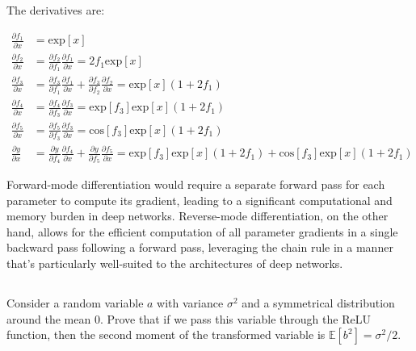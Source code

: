 \documentclass[12pt]{report}
\begin{document}
The derivatives are:

\begin{align*}
    \frac{\partial f_{1}}{\partial x} & = \text{exp}[x]                                                                                                                                                                                                                     \\
    \frac{\partial f_{2}}{\partial x} & = \frac{\partial f_{2}}{\partial f_{1}}\frac{\partial f_{1}}{\partial x} = 2f_{1}\text{exp}[x]                                                                                                                                      \\
    \frac{\partial f_{3}}{\partial x} & = \frac{\partial f_{3}}{\partial f_{1}}\frac{\partial f_{1}}{\partial x} + \frac{\partial f_{3}}{\partial f_{2}}\frac{\partial f_{2}}{\partial x} = \text{exp}[x](1 + 2f_{1})                                                       \\
    \frac{\partial f_{4}}{\partial x} & = \frac{\partial f_{4}}{\partial f_{3}}\frac{\partial f_{3}}{\partial x} = \text{exp}[f_{3}]\text{exp}[x](1 + 2f_{1})                                                                                                               \\
    \frac{\partial f_{5}}{\partial x} & = \frac{\partial f_{5}}{\partial f_{3}}\frac{\partial f_{3}}{\partial x} = \text{cos}[f_{3}]\text{exp}[x](1 + 2f_{1})                                                                                                               \\
    \frac{\partial y}{\partial x}     & = \frac{\partial y}{\partial f_{4}}\frac{\partial f_{4}}{\partial x} + \frac{\partial y}{\partial f_{5}}\frac{\partial f_{5}}{\partial x} = \text{exp}[f_{3}]\text{exp}[x](1 + 2f_{1}) + \text{cos}[f_{3}]\text{exp}[x](1 + 2f_{1})
\end{align*}

Forward-mode differentiation would require a separate forward pass for each parameter to compute its gradient, leading to a significant computational and memory burden in deep networks. Reverse-mode differentiation, on the other hand, allows for the efficient computation of all parameter gradients in a single backward pass following a forward pass, leveraging the chain rule in a manner that's particularly well-suited to the architectures of deep networks.

\subsection{}
\begin{mdframed}
    Consider a random variable $a$ with variance $\sigma^{2}$ and a symmetrical distribution around the mean 0. Prove that if we pass this variable through the ReLU function, then the second moment of the transformed variable is $\mathbb{E}[b^{2}] = \sigma^{2}/2$.
\end{mdframed}
\end{document}
